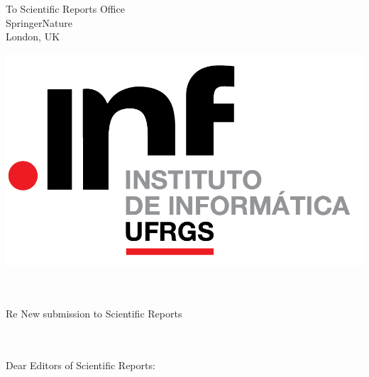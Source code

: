 \documentclass[10pt]{letter} %
\begin{document}






\begin{letter}{To Scientific Reports Office\\
SpringerNature\\
London, UK
 } 

\includegraphics[scale=0.48]{logo.png}\\ \ \\ \ \\









\opening{Re New submission to Scientific Reports\\
\\ \ \\}

 Dear Editors of Scientific Reports: 


\end{letter}
\end{document}
